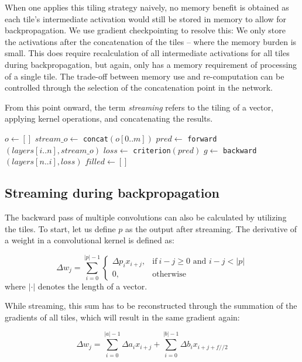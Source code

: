\documentclass[
  12pt,
  a5,margin=2cmpaper,
]{article}
\begin{document}
When one applies this tiling strategy naively, no memory benefit is
obtained as each tile's intermediate activation would still be stored in
memory to allow for backpropagation. We use gradient checkpointing to
resolve this: We only store the activations after the concatenation of
the tiles -- where the memory burden is small. This does require
recalculation of all intermediate activations for all tiles during
backpropagation, but again, only has a memory requirement of processing
of a single tile. The trade-off between memory use and re-computation
can be controlled through the selection of the concatenation point in
the network.

From this point onward, the term \emph{streaming} refers to the tiling
of a vector, applying kernel operations, and concatenating the results.

\(o\gets[]\) \(stream\_o\gets\) \texttt{concat}\((o[0..m])\)
\(pred\gets\) \texttt{forward}\((layers[i..n], stream\_o)\)
\(loss\gets\) \texttt{criterion}\((pred)\) \(g\gets\)
\texttt{backward}\((layers[n..i], loss)\) \(filled\gets[]\)

\hypertarget{backwardpass}{%
\subsection{Streaming during backpropagation}\label{backwardpass}}

The backward pass of multiple convolutions can also be calculated by
utilizing the tiles. To start, let us define \(p\) as the output after
streaming. The derivative of a weight in a convolutional kernel is
defined as:

\[%
\Delta w_j = \sum_{i=0}^{\lvert p \rvert-1}
\begin{cases}
  \Delta p_i x_{i+j}, & \text{if}\ i - j \geq 0 \text{ and } i - j < \lvert p \rvert \\
%              
  0, & \text{otherwise}
\end{cases}\] where \(\lvert \cdot\rvert\) denotes the length of a
vector.

While streaming, this sum has to be reconstructed through the summation
of the gradients of all tiles, which will result in the same gradient
again:

\[\label{eq:6}
\Delta w_j = \sum_{i=0}^{\lvert a \rvert-1} \Delta a_i x_{i+j} + \sum_{i=0}^{\lvert b \rvert-1} \Delta b_i x_{i+j+f//2}\]
\end{document}
